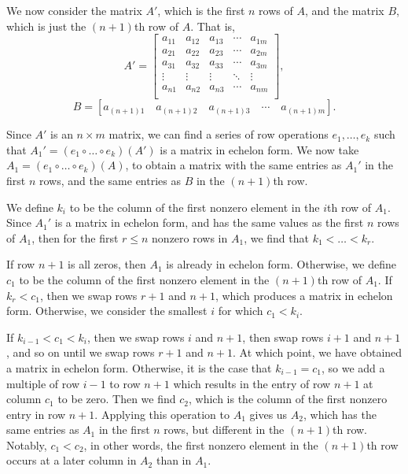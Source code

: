 \documentclass[12pt]{article}
\begin{document}
We now consider the matrix $A'$, which is the first $n$ rows of $A$, and the matrix $B$, which is just the $(n+1)$th row of $A$. That is,
\[A' =
    \begin{bmatrix}
        a_{11} & a_{12} & a_{13} & \cdots & a_{1m} \\
        a_{21} & a_{22} & a_{23} & \cdots & a_{2m} \\
        a_{31} & a_{32} & a_{33} & \cdots & a_{3m} \\
        \vdots & \vdots & \vdots & \ddots & \vdots \\
        a_{n1} & a_{n2} & a_{n3} & \cdots & a_{nm} \\
    \end{bmatrix}
,\]
\[B = [a_{(n+1)1} \quad a_{(n+1)2} \quad a_{(n+1)3} \quad \cdots \quad a_{(n+1)m}].\]

Since $A'$ is an $n\times m$ matrix, we can find a series of row operations $e_1,\dots,e_k$ such that $A_1' = (e_1 \circ\dots\circ e_k)(A')$ is a matrix in echelon form. We now take $A_1 = (e_1 \circ\dots\circ e_k)(A)$, to obtain a matrix with the same entries as $A_1'$ in the first $n$ rows, and the same entries as $B$ in the $(n+1)$th row.

We define $k_i$ to be the column of the first nonzero element in the $i$th row of $A_1$. Since $A_1'$ is a matrix in echelon form, and has the same values as the first $n$ rows of $A_1$, then for the first $r\leq n$ nonzero rows in $A_1$, we find that $k_1<\dots<k_r$.

If row $n+1$ is all zeros, then $A_1$ is already in echelon form. Otherwise, we define $c_1$ to be the column of the first nonzero element in the $(n+1)$th row of $A_1$. If $k_r<c_1$, then we swap rows $r+1$ and $n+1$, which produces a matrix in echelon form. Otherwise, we consider the smallest $i$ for which $c_1<k_i$.

If $k_{i-1}<c_1<k_i$, then we swap rows $i$ and $n+1$, then swap rows $i+1$ and $n+1$, and so on until we swap rows $r+1$ and $n+1$. At which point, we have obtained a matrix in echelon form. Otherwise, it is the case that $k_{i-1}=c_1$, so we add a multiple of row $i-1$ to row $n+1$ which results in the entry of row $n+1$ at column $c_1$ to be zero. Then we find $c_2$, which is the column of the first nonzero entry in row $n+1$. Applying this operation to $A_1$ gives us $A_2$, which has the same entries as $A_1$ in the first $n$ rows, but different in the $(n+1)$th row. Notably, $c_1<c_2$, in other words, the first nonzero element in the $(n+1)$th row occurs at a later column in $A_2$ than in $A_1$. 
\end{document}
